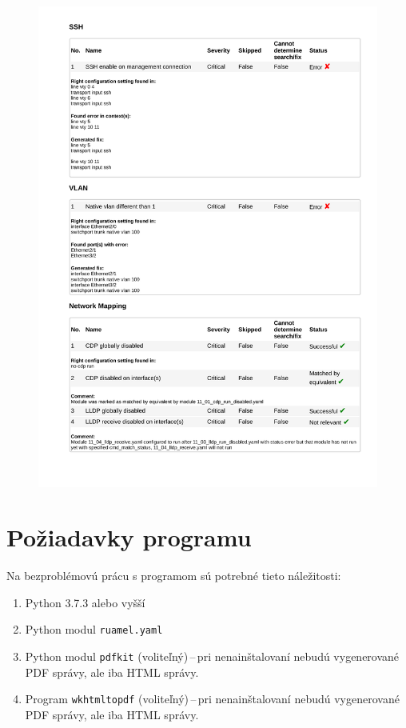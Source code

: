 \begin{figure}[H]
	\begin{center}
		\includegraphics[scale=0.85]{obrazky/report_html_page_2.pdf}
	\end{center}
	
	\label{report_2}
\end{figure}

\section{Požiadavky programu}
Na bezproblémovú prácu s programom sú potrebné tieto náležitosti:
\begin{enumerate}
	\item Python 3.7.3 alebo vyšší
	\item Python modul \texttt{ruamel.yaml}
	\item Python modul \texttt{pdfkit} (voliteľný)\,--\,pri nenainštalovaní nebudú vygenerované PDF správy, ale iba HTML správy.
	\item Program \texttt{wkhtmltopdf} (voliteľný)\,--\,pri nenainštalovaní nebudú vygenerované PDF správy, ale iba HTML správy.
\end{enumerate}





